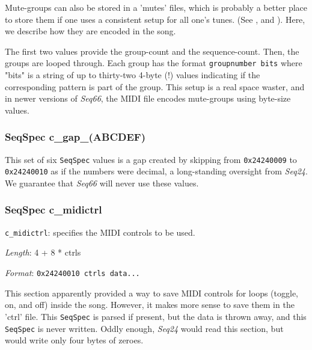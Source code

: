    Mute-groups can also be stored in a 'mutes' files, which is probably a better
   place to store them if one uses a consistent setup for all one's tunes.
   (See , and
   ).
   Here, we describe how they are encoded in the song.

   The first two values provide the group-count and the sequence-count.
   Then, the groups are looped through. Each group has the format
   \texttt{groupnumber bits} where "bits" is a string of up to thirty-two
   4-byte (!) values indicating if the corresponding pattern is part of
   the group.  This setup is a real space waster, and in newer versions of
   \textsl{Seq66}, the MIDI file encodes mute-groups using byte-size values.

\subsubsection{SeqSpec c\_gap\_(ABCDEF)}
\label{subsubsec:midi_format_track_seqspec_gap_abcdef}

   This set of six
   \texttt{SeqSpec} values is a gap created by skipping from
   \texttt{0x24240009} to \texttt{0x24240010} as if the numbers were
   decimal, a long-standing oversight from \textsl{Seq24}.
   We guarantee that \textsl{Seq66} will never use these values.

\subsubsection{SeqSpec c\_midictrl}
\label{subsubsec:midi_format_track_seqspec_midictrl}

   \begin{description}
      \item \texttt{c\_midictrl}: specifies the MIDI controls to be used.
      \item \textsl{Length}: 4 + 8 * ctrls
      \item \textsl{Format}: \texttt{0x24240010 ctrls data...}
   \end{description}
   
   This section apparently provided a way to save MIDI controls for loops
   (toggle, on, and off) inside the song.  However, it makes more sense to
   save them in the 'ctrl' file.  This
   \texttt{SeqSpec} is parsed if present, but
   the data is thrown away, and this
   \texttt{SeqSpec} is never written.
   Oddly enough, \textsl{Seq24} would read this section, but would write only
   four bytes of zeroes.

